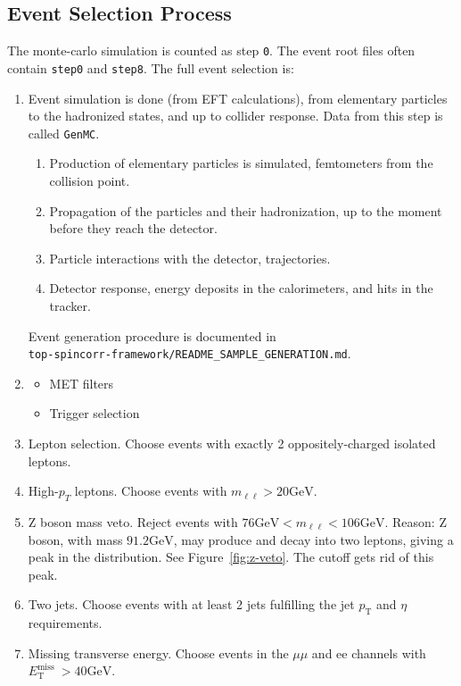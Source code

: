 \subsection{Event Selection Process}
The monte-carlo simulation is counted as step \verb|0|. The event root files often contain \verb|step0| and \verb|step8|. The full event selection is:
\begin{enumerate}
    \item [Step 0] Event simulation is done (from EFT calculations), from elementary particles to the hadronized states, and up to collider response. Data from this step is called \verb|GenMC|.
    \begin{enumerate}
        \item Production of elementary particles is simulated, femtometers from the collision point.
        \item Propagation of the particles and their hadronization, up to the moment before they reach the detector.
        \item Particle interactions with the detector, trajectories.
        \item Detector response, energy deposits in the calorimeters, and hits in the tracker.
    \end{enumerate}
    Event generation procedure is documented in \\
    \verb|top-spincorr-framework/README_SAMPLE_GENERATION.md|.
    \item [Step 1]
    \begin{itemize}
        \item [1a] MET filters
        \item [1b] Trigger selection
    \end{itemize}
    \item [Step 2] Lepton selection. Choose events with exactly 2 oppositely-charged isolated leptons.
    \item [Step 3] High-$p_T$ leptons. Choose events with $m_{\ell \ell}>20 \mathrm{GeV}$.
    \item [Step 4] Z boson mass veto. Reject events with $76 \mathrm{GeV}<m_{\ell \ell}<106 \mathrm{GeV}$. Reason: Z boson, with mass $91.2 \mathrm{GeV}$, may produce and decay into two leptons, giving a peak in the distribution. See Figure~\ref{fig:z-veto}. The cutoff gets rid of this peak.
    \item [Step 5] Two jets. Choose events with at least 2 jets fulfilling the jet $p_{\mathrm{T}}$ and $\eta$ requirements.
    \item [Step 6] Missing transverse energy. Choose events in the $\mu \mu$ and ee channels with $E_{\mathrm{T}}^{\text {miss }}>40 \mathrm{GeV}$.

\end{enumerate}
